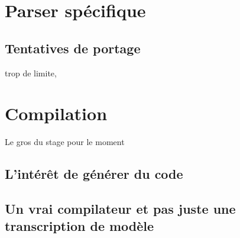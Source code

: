 \section{Parser spécifique}

\subsection{Tentatives de portage}

trop de limite,
\section{Compilation}

Le gros du stage pour le moment

\subsection{L'intérêt de générer du code}

\subsection{Un vrai compilateur et pas juste une transcription de modèle}